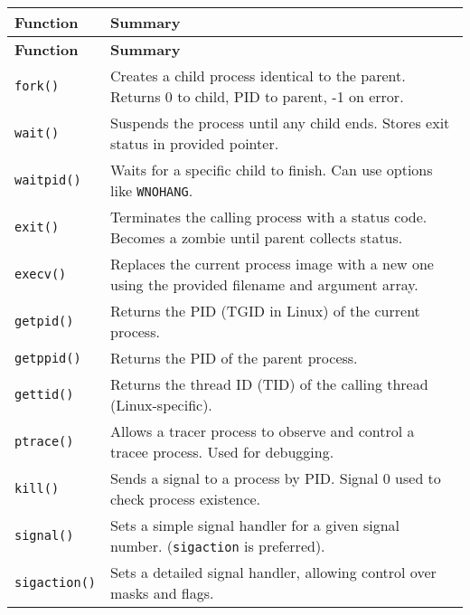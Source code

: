 \documentclass[openany,12pt]{book}
\newcommand{\code}[1]{\texttt{#1}}
\begin{document}
\renewcommand{\arraystretch}{1.2} %
\begin{longtable}{|>{\raggedright\arraybackslash}p{3.5cm}|>{\raggedright\arraybackslash}p{11.5cm}|}
  \hline
  \rowcolor{RoyalBlue!25}
  \textbf{Function} & \textbf{Summary}                                                                                  \\
  \endfirsthead

  \hline
  \textbf{Function} & \textbf{Summary}                                                                                  \\
  \endhead

  \hline
  \code{fork()}     & Creates a child process identical to the parent. Returns 0 to child, PID to parent, -1 on error.  \\
  \code{wait()}     & Suspends the process until any child ends. Stores exit status in provided pointer.                  \\
  \code{waitpid()}  & Waits for a specific child to finish. Can use options like \code{WNOHANG}.                        \\
  \code{exit()}     & Terminates the calling process with a status code. Becomes a zombie until parent collects status. \\
  \code{execv()}    & Replaces the current process image with a new one using the provided filename and argument array. \\
  \code{getpid()}   & Returns the PID (TGID in Linux) of the current process.                                           \\
  \code{getppid()}  & Returns the PID of the parent process.                                                            \\
  \code{gettid()}   & Returns the thread ID (TID) of the calling thread (Linux-specific).                               \\
  \code{ptrace()}   & Allows a tracer process to observe and control a tracee process. Used for debugging.              \\
  \hline
  \code{kill()}     & Sends a signal to a process by PID. Signal 0 used to check process existence.                     \\
  \code{signal()}   & Sets a simple signal handler for a given signal number. (\code{sigaction} is preferred).          \\
  \code{sigaction()} & Sets a detailed signal handler, allowing control over masks and flags.                            \\

\end{longtable}
\end{document}
